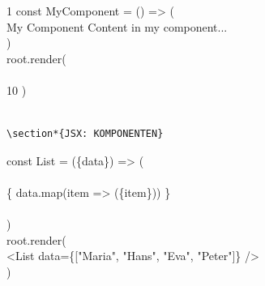 \documentclass[10pt]{article}
\begin{document}
1 const MyComponent = () => (\\

My Component
Content in my component...
\\
)\\
root.render(\\
\\
10 )

\begin{verbatim}

\section*{JSX: KOMPONENTEN}
\end{verbatim}

const List = (\{data\}) => (\\
\\
\{ data.map(item => (\{item\})) \}\\
\\
)\\
root.render(\\[0pt]
<List data=\{["Maria", "Hans", "Eva", "Peter"]\} />\\
)
\end{document}
